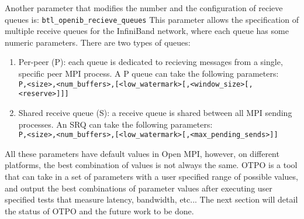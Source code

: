 Another parameter that modifies the number and the configuration of recieve
queues is: {\tt btl\_openib\_recieve\_queues} This parameter allows the
specification of multiple receive queues for the InfiniBand network, where
each queue has some numeric parameters. There are two types of queues:
\begin{enumerate}
\item Per-peer (P): each queue is dedicated to recieving messages from a
  single, specific peer MPI process. A P queue can take the following
  parameters:\\
  {\tt P,<size>,<num\_buffers>,[<low\_watermark>[,<window\_size>[,<reserve>]]]}
\item Shared receive queue (S): a receive queue is shared between all MPI
  sending processes. An SRQ can take the following parameters: \\
  {\tt P,<size>,<num\_buffers>,[<low\_watermark>[,<max\_pending\_sends>]]}
\end{enumerate}

All these parameters have default values in Open MPI, however, on different
platforms, the best combination of values is not always the same. OTPO is a
tool that can take in a set of parameters with a user specified range of
possible values, and output the best combinations of parameter values after
executing user specified tests that measure latency, bandwidth, etc... The
next section will detail the status of OTPO and the future work to be done.



